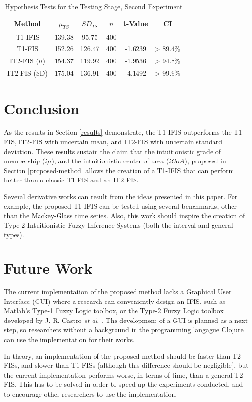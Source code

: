 \documentclass[conference]{IEEEtran}
\begin{document}
\begin{table}[!t]
  \renewcommand{\arraystretch}{1.3}
  \caption{Hypothesis Tests for the Testing Stage, Second Experiment}
  \label{second-hypothesis-tests-testing}
  \centering
  \begin{tabular}{|c|c|c|c|c|c|}
    \hline
    Method & $\mu_{TS}$ & $SD_{TS}$ & $n$ & t-Value & CI\\
    \hline
    T1-IFIS & 139.38 & 95.75 & 400 &  &  \\
    \hline
    T1-FIS & 152.26 & 126.47 & 400 & -1.6239 & > 89.4\% \\
    \hline
    IT2-FIS (\(\mu\)) & 154.37 & 119.92 & 400 & -1.9536 & > 94.8\% \\
    \hline
    IT2-FIS (SD) & 175.04 & 136.91 & 400 & -4.1492 & > 99.9\%\\
    \hline
  \end{tabular}
\end{table}

\section{Conclusion}
\label{conclusion}

As the results in Section \ref{results} demonstrate, the T1-IFIS
outperforms the T1-FIS, IT2-FIS with uncertain mean, and IT2-FIS with
uncertain standard deviation. These results sustain the claim that the
intuitionistic grade of membership ($i\mu$), and the intuitionistic center
of area ($iCoA$), proposed in Section \ref{proposed-method} allows the
creation of a T1-IFIS that can perform better than a classic T1-FIS
and an IT2-FIS.

Several derivative works can result from the ideas presented in this paper. For
example, the proposed T1-IFIS can be tested using several
benchmarks, other than the Mackey-Glass time series. Also, this work
should inspire the creation of Type-2 Intuitionistic Fuzzy Inference
Systems (both the interval and general types).

\section{Future Work}
\label{future-work}

The current implementation of the proposed method lacks a Graphical User
Interface (GUI) where a research can conveniently design an IFIS, such as
Matlab's Type-1 Fuzzy Logic toolbox, or the Type-2 Fuzzy Logic toolbox
developed by J. R. Castro \textit{et al.} \cite{castro2007interval}. The
development of a GUI is planned as a next step, so researchers without
a background in the programming langague Clojure can use the
implementation for their works.

In theory, an implementation of the proposed method should be faster
than T2-FISs, and slower than T1-FISs (although this difference should
be negligible), but the current implementation performs worse, in
terms of time, than a general T2-FIS. This has to be solved in order
to speed up the experiments conducted, and to encourage other
researchers to use the implementation.



\end{document}

